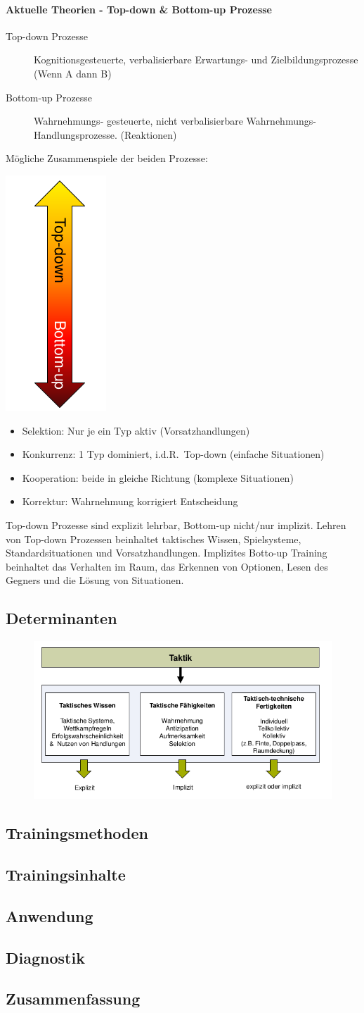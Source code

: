 \paragraph{Aktuelle Theorien - Top-down \& Bottom-up Prozesse}
\begin{description}
  \item[Top-down Prozesse] Kognitionsgesteuerte, verbalisierbare Erwartungs- und Zielbildungsprozesse (Wenn A dann B)
  \item[Bottom-up Prozesse] Wahrnehmungs- gesteuerte, nicht verbalisierbare Wahrnehmungs- Handlungsprozesse. (Reaktionen)
\end{description}
Mögliche Zusammenspiele der beiden Prozesse:\\
\begin{minipage}{0.1\textwidth}
  \includegraphics[width=\textwidth]{pictures/taktik_top-down_bottom-up.png}
\end{minipage}
\begin{minipage}{0.9\textwidth}
  \begin{itemize}
    \item Selektion: Nur je ein Typ aktiv (Vorsatzhandlungen)
    \item Konkurrenz: 1 Typ dominiert, i.d.R.\ Top-down (einfache Situationen)
    \item Kooperation: beide in gleiche Richtung (komplexe Situationen)
    \item Korrektur: Wahrnehmung korrigiert Entscheidung
  \end{itemize}
\end{minipage}
Top-down Prozesse sind explizit lehrbar, Bottom-up nicht/nur implizit. Lehren von Top-down Prozessen beinhaltet taktisches Wissen, Spielsysteme, Standardsituationen und Vorsatzhandlungen. Implizites Botto-up Training beinhaltet das Verhalten im Raum, das Erkennen von Optionen, Lesen des Gegners und die Lösung von Situationen.

\subsection{Determinanten}
\begin{figure}[H]
  \centering
  \includegraphics[width=.7\textwidth]{pictures/taktik_determinanten.png}
\end{figure}

\subsection{Trainingsmethoden}

\subsection{Trainingsinhalte}

\subsection{Anwendung}

\subsection{Diagnostik}

\subsection{Zusammenfassung}
